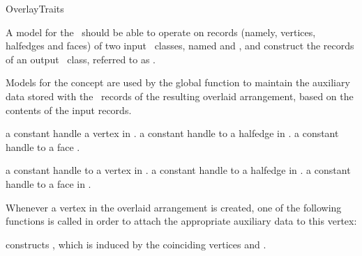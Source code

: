 
\ccRefPageBegin

\begin{ccRefConcept}{OverlayTraits}

A model for the \ccRefName\ should be able to operate on records (namely,
vertices, halfedges and faces) of two input \dcel\ classes, named
 and , and construct the records of an output \dcel\
class, referred to as .

Models for the concept are used by the global  function to
maintain the auxiliary data stored with the \dcel\ records of the resulting
overlaid arrangement, based on the contents of the input records.

\ccTypes

{a constant handle a vertex in .}
\ccGlue
{}
{a constant handle to a halfedge in .}
\ccGlue
{}
{a constant handle to a face .}

{a constant handle to a vertex in .}
\ccGlue
{}
{a constant handle to a halfedge in .}
\ccGlue
{}
{a constant handle to a face in .}

\ccGlue
{}
\ccGlue
{}



Whenever a vertex in the overlaid arrangement is created, one of the
following functions is called in order to attach the appropriate
auxiliary data to this vertex:
    
    {constructs , which is induced by the coinciding vertices 
     \ccc{v1} and \ccc{v2}.}


\end{ccRefConcept}
